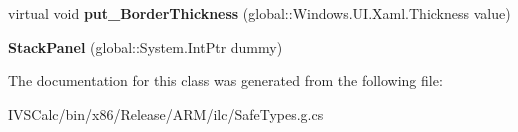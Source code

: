 \begin{DoxyCompactItemize}
\item 
\mbox{\label{class_windows_1_1_u_i_1_1_xaml_1_1_controls_1_1_stack_panel_a38a527c8e47cfb60586c9887434f6e3f}} 
virtual void {\bfseries put\+\_\+\+Border\+Thickness} (global\+::\+Windows.\+U\+I.\+Xaml.\+Thickness value)
\item 
\mbox{\label{class_windows_1_1_u_i_1_1_xaml_1_1_controls_1_1_stack_panel_ae651e05203c4e2a0ddc04022e050a4e7}} 
{\bfseries Stack\+Panel} (global\+::\+System.\+Int\+Ptr dummy)
\end{DoxyCompactItemize}


The documentation for this class was generated from the following file\+:\begin{DoxyCompactItemize}
\item 
I\+V\+S\+Calc/bin/x86/\+Release/\+A\+R\+M/ilc/Safe\+Types.\+g.\+cs\end{DoxyCompactItemize}
